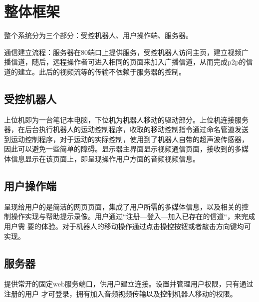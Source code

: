 \chapter{整体框架}

整个系统分为三个部分：受控机器人、用户操作端、服务器。

通信建立流程：服务器在80端口上提供服务，受控机器人访问主页，建立视频广
播信道，随后，远程操作者可进入相同的页面来加入广播信道，从而完成p2p的信
道的建立。此后的视频流等的传输不依赖于服务器的控制。

\section{受控机器人}

上位机即为一台笔记本电脑，下位机为机器人移动的驱动部分。上位机连接服务
器，在后台执行机器人的运动控制程序，收取的移动控制指令通过命名管道发送
到运动控制程序，对于运动的实际控制，使用到了机器人自带的超声波传感器，
因此可以避免一些简单的障碍。显示器主界面显示视频通信页面，接收到的多媒
体信息显示在该页面上，即呈现操作用户方面的音频视频信息。

\section{用户操作端}

呈现给用户的是简洁的网页页面，集成了用户所需的多媒体信息，以及相关的控
制操作实现与帮助提示录像。用户通过“注册—登入—加入已存在的信道“，来完成用户需
要的体验。对于机器人的移动操作通过点击操控按钮或者敲击方向键均可实现。

\section{服务器}

提供常开的固定web服务端口，供用户建立连接。设置并管理用户权限，只有通过注册的用户
才可登录，拥有加入音频视频传输以及控制机器人移动的权限。
